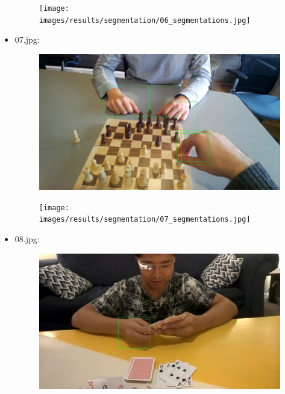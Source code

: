 \begin{itemize}
\begin{figure}[!htb]
\begin{minipage}{0.5\textwidth}
            \end{minipage}\hfill
            \begin{minipage}{0.5\textwidth}
                \centering
                \texttt{[image: images/results/segmentation/06\_segmentations.jpg]}
            \end{minipage}
        \end{figure}
    \item 07.jpg:
       \begin{figure}[!htb]
            \begin{minipage}{0.5\textwidth}
                \centering
                \includegraphics[scale = 0.205]{images/results/detection/07_detections.jpg}
            \end{minipage}\hfill
            \begin{minipage}{0.5\textwidth}
                \centering
                \texttt{[image: images/results/segmentation/07\_segmentations.jpg]}
            \end{minipage}
        \end{figure}
    \item 08.jpg:
        \begin{figure}[!htb]
            \begin{minipage}{0.5\textwidth}
                \centering
                \includegraphics[scale = 0.205]{images/results/detection/08_detections.jpg}

\end{minipage}
\end{figure}
\end{itemize}
